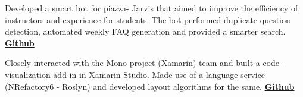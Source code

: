 \documentclass[]{resume-openfont}
\begin{document}
\begin{minipage}[t]{0.74\textwidth}
\vspace{-7pt}\justify Developed a smart bot for piazza- Jarvis that aimed to improve the efficiency of instructors and experience for students. The bot performed duplicate question detection, automated weekly FAQ generation and provided a smarter search.  \textbf{\href{https://github.com/pranavr93/piazza_bot}{Github}}
\sectionsep

\vspace{-7pt}\justify Closely interacted with the Mono project (Xamarin) team and built a code-visualization add-in in Xamarin Studio. Made use of a language service (NRefactory6 - Roslyn) and developed layout algorithms for the same. \textbf{\href{https://github.com/pranavr93/MDClassDiagram}{Github}}
\sectionsep







\end{minipage}
\end{document}
